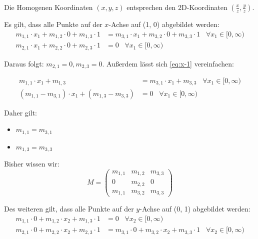 \documentclass[a4paper]{scrartcl}
\begin{document}
Die Homogenen Koordinaten $(x, y, z)$ entsprechen den 2D-Koordinaten
$(\frac{x}{z}, \frac{y}{z})$.

\goodbreak
Es gilt, dass alle Punkte auf der $x$-Achse auf (1, 0) abgebildet werden:\nobreak
\begin{align}
    m_{1,1} \cdot x_1 + m_{1,2} \cdot 0 + m_{1,3} \cdot 1 &= m_{3,1} \cdot x_1 + m_{3,2} \cdot 0 + m_{3,3} \cdot 1 \;\;\; \forall x_1 \in [0, \infty) \label{eq:x-1}\\
    m_{2,1} \cdot x_1 + m_{2,2} \cdot 0 + m_{2,3} \cdot 1 &= 0 \;\;\; \forall x_1 \in [0, \infty)
\end{align}

Daraus folgt: $m_{2,1} = 0, m_{2,3} = 0$. Außerdem lässt sich \cref{eq:x-1}
vereinfachen:

\begin{align}
    m_{1,1} \cdot x_1 +  m_{1,3} &= m_{3,1} \cdot x_1 + m_{3,3} \;\;\; \forall x_1 \in [0, \infty)\\
    (m_{1,1} - m_{3,1}) \cdot x_1 + (m_{1,3} - m_{3,3}) &= 0 \;\;\; \forall x_1 \in [0, \infty)\label{eq:x-1.1}
\end{align}

Daher gilt:

\begin{itemize}
    \item $m_{1,1} = m_{3,1}$
    \item $m_{1,3} = m_{3,3}$
\end{itemize}

Bisher wissen wir:\nobreak
\[M = \begin{pmatrix}            m_{1,1} & m_{1,2} & m_{3,3}\\
                                       0 & m_{2,2} & 0\\
                                 m_{1,1} & m_{3,2} & m_{3,3}\end{pmatrix}\]

\goodbreak
Des weiteren gilt, dass alle Punkte auf der $y$-Achse auf (0, 1) abgebildet werden:\nobreak
\begin{align}
    m_{1,1} \cdot 0 + m_{1,2} \cdot x_2 + m_{1,3} \cdot 1 &= 0 \;\;\; \forall x_2 \in [0, \infty)\\
    m_{2,1} \cdot 0 + m_{2,2} \cdot x_2 + m_{2,3} \cdot 1 &= m_{3,1} \cdot 0 + m_{3,2} \cdot x_2 + m_{3,3} \cdot 1 \;\;\; \forall x_2 \in [0, \infty)
\end{align}
\end{document}

